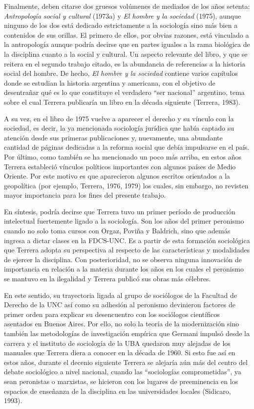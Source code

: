 Finalmente, deben citarse dos gruesos volúmenes de mediados de los años setenta: \emph{Antropología social y cultural} (1973a) y \emph{El hombre y la sociedad} (1975), aunque ninguno de los dos está dedicado estrictamente a la sociología sino más bien a contenidos de sus orillas. El primero de ellos, por obvias razones, está vinculado a la antropología aunque podría decirse que en partes iguales a la rama biológica de la disciplina cuanto a la social y cultural. Un aspecto relevante del libro, y que se reitera en el segundo trabajo citado, es la abundancia de referencias a la historia social del hombre. De hecho, \emph{El hombre y la sociedad} contiene varios capítulos donde se estudian la historia argentina y americana, con el objetivo de desentrañar qué es lo que constituye el verdadero ``ser nacional'' argentino, tema sobre el cual Terrera publicaría un libro en la década siguiente (Terrera, 1983).

A su vez, en el libro de 1975 vuelve a aparecer el derecho y su vínculo con la sociedad, es decir, la ya mencionada sociología jurídica que había captado su atención desde sus primeras publicaciones y, nuevamente, una abundante cantidad de páginas dedicadas a la reforma social que debía impulsarse en el país. Por último, como también se ha mencionado un poco más arriba, en estos años Terrera estableció vínculos políticos importantes con algunos países de Medio Oriente. Por este motivo es que aparecieron algunos escritos orientados a la geopolítica (por ejemplo, Terrera, 1976, 1979) los cuales, sin embargo, no revisten mayor importancia para los fines del presente trabajo.

En síntesis, podría decirse que Terrera tuvo un primer período de producción intelectual fuertemente ligado a la sociología. Son los años del primer peronismo cuando no solo toma cursos con Orgaz, Poviña y Baldrich, sino que además ingresa a dictar clases en la FDCS-UNC. Es a partir de esta formación sociológica que Terrera adopta su perspectiva al respecto de las características y modalidades de ejercer la disciplina. Con posterioridad, no se observa ninguna innovación de importancia en relación a la materia durante los años en los cuales el peronismo se mantuvo en la ilegalidad y Terrera publicó sus obras más célebres.

En este sentido, su trayectoria ligada al grupo de sociólogos de la Facultad de Derecho de la UNC así como su adhesión al peronismo devinieron factores de primer orden para explicar su desencuentro con los sociólogos científicos asentados en Buenos Aires. Por ello, no solo la teoría de la modernización sino también las metodologías de investigación empírica que Germani impulsó desde la carrera y el instituto de sociología de la UBA quedaron muy alejadas de los manuales que Terrera diera a conocer en la década de 1960. Si esto fue así en estos años, durante el decenio siguiente Terrera se alejaría aún más del centro del debate sociológico a nivel nacional, cuando las ``sociologías comprometidas'', ya sean peronistas o marxistas, se hicieron con los lugares de preeminencia en los espacios de enseñanza de la disciplina en las universidades locales (Sidicaro, 1993).

